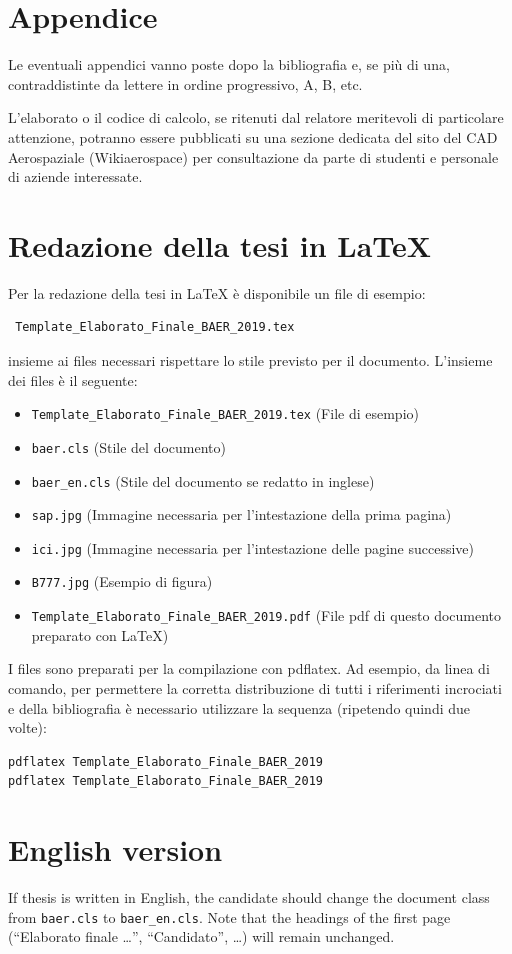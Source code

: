 \documentclass{baer}
\begin{document}
\appendix
\section{Appendice}

Le eventuali appendici vanno poste dopo la bibliografia e, se più di una, contraddistinte da lettere in ordine progressivo, A, B, etc.

\bigskip


L’elaborato o il codice di calcolo, se ritenuti dal relatore
meritevoli di particolare attenzione, potranno essere
pubblicati su una sezione dedicata del sito del CAD
Aerospaziale (Wikiaerospace) per consultazione da
parte di studenti e personale di aziende interessate.

\section{Redazione della tesi in LaTeX}
Per la redazione della tesi in LaTeX è disponibile un file di esempio:
\begin{verbatim} Template_Elaborato_Finale_BAER_2019.tex \end{verbatim} 
insieme ai files necessari rispettare lo stile previsto per il documento.
L'insieme dei files è il seguente:
\begin{itemize}
 \item \verb=Template_Elaborato_Finale_BAER_2019.tex= (File di esempio)
 \item \verb=baer.cls= (Stile del documento)
 \item \verb=baer_en.cls= (Stile del documento se redatto in inglese)
 \item \verb=sap.jpg= (Immagine necessaria per l'intestazione della prima pagina)
 \item \verb=ici.jpg= (Immagine necessaria per l'intestazione delle pagine successive)
 \item \verb=B777.jpg= (Esempio di figura)
 \item \verb=Template_Elaborato_Finale_BAER_2019.pdf= (File pdf di questo documento preparato con LaTeX)
\end{itemize}
I files sono preparati per la compilazione con pdflatex. %
Ad esempio, da linea di comando,  
per permettere la corretta distribuzione di tutti i riferimenti incrociati e della bibliografia è necessario 
utilizzare la sequenza (ripetendo quindi due volte):\\
\begin{verbatim} 
pdflatex Template_Elaborato_Finale_BAER_2019 
pdflatex Template_Elaborato_Finale_BAER_2019 
\end{verbatim}

\section{English version}
If thesis is written in English, the candidate should change the 
document class from \verb=baer.cls= to \verb=baer_en.cls=. 
Note that the headings of the first page (``Elaborato finale \ldots'', ``Candidato'', 
\ldots) will remain unchanged.
\end{document}
